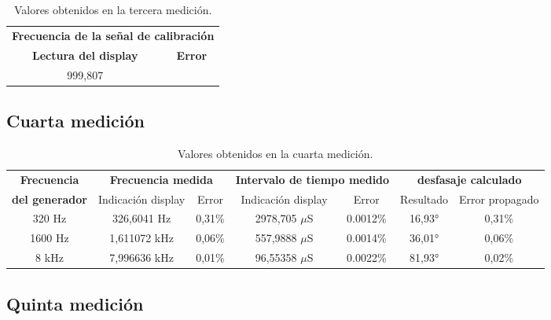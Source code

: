 \documentclass{article}
\begin{document}
\begin{table}[!hbt]
	\begin{center}
		\begin{tabular}{|c|c|} \hline
			\multicolumn{2}{|c|}{\textbf{Frecuencia de la señal de calibración}} \\\cline{1-2}
			\textbf{Lectura del display} & \textbf{Error} \\\hline
			999,807 & \\\hline
		\end{tabular}

	\caption{Valores obtenidos en la tercera medición.}
	\end{center}
\end{table}
\medskip



\subsection{Cuarta medición}


\begin{table}[!hbt]
	\begin{center}

		\begin{tabular}{|c|c|c|c|c|c|c|} \hline
			\textbf{Frecuencia} & \multicolumn{2}{c|}{\textbf{Frecuencia medida}} & \multicolumn{2}{c|}{\textbf{Intervalo de tiempo medido}} & \multicolumn{2}{c|}{\textbf{desfasaje calculado}} \\\cline{2-7}
			\textbf{del generador} & Indicación display & Error & Indicación display & Error & Resultado & Error propagado \\\hline
			
			320 Hz & 326,6041 Hz & 0,31\% & 2978,705 $\mu$S & 0.0012\% & 16,93° & 0,31\% \\\hline
			1600 Hz & 1,611072 kHz & 0,06\% & 557,9888 $\mu$S & 0.0014\% & 36,01° & 0,06\% \\\hline
			8 kHz & 7,996636 kHz & 0,01\% & 96,55358 $\mu$S & 0.0022\% & 81,93° & 0,02\% \\\hline

		\end{tabular}

	\caption{Valores obtenidos en la cuarta medición.}
	\end{center}
\end{table}
\medskip



\subsection{Quinta medición}
\end{document}
